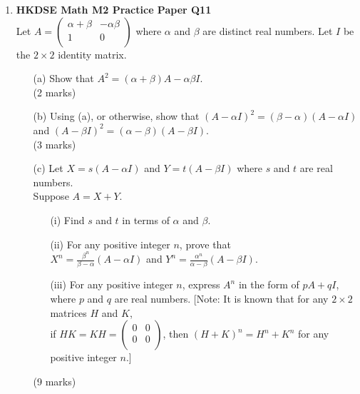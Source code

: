 \documentclass[12pt]{article}
\begin{document}
\begin{enumerate}
	\item \textbf{HKDSE Math M2 Practice Paper Q11}\\
	Let $A = \begin{pmatrix}
		\alpha + \beta & -\alpha\beta \\
		1 & 0 \\
	\end{pmatrix}$ where $\alpha$ and $\beta$ are distinct real numbers. Let $I$ be the $2\times2$ identity matrix.  
	\begin{enumerate}
		\item [(a)]Show that $A^2 = (\alpha +\beta)A - \alpha\beta I$. \\(2 marks)
		\item [(b)]Using (a), or otherwise, show that $(A - \alpha I)^2 = (\beta - \alpha)(A - \alpha I)$ and $(A - \beta I)^2 = (\alpha - \beta)(A - \beta I)$. \\(3 marks)
		\item [(c)]Let $X = s(A-\alpha I)$ and $Y = t(A-\beta I)$ where $s$ and $t$ are real numbers. \\
		Suppose $A = X + Y$.
		\begin{enumerate}
			\item [(i)]Find $s$ and $t$ in terms of $\alpha$ and $\beta$.
			\item [(ii)]For any positive integer $n$, prove that \\
			$X^n = \displaystyle\frac{\beta^n}{\beta - \alpha} (A - \alpha I)$ and $Y^n = \displaystyle\frac{\alpha^n}{\alpha - \beta}(A - \beta I)$.
			\item [(iii)]For any positive integer $n$, express $A^n$ in the form of $pA + qI$, where $p$ and $q$ are real numbers.  
			[Note: It is known that for any $2\times2 $ matrices $H$ and $K$,\\
			if $HK = KH = \begin{pmatrix}
				0&0\\0&0\\
			\end{pmatrix}$, then $(H+K)^n = H^n + K^n$ for any positive integer $n$.]
		\end{enumerate}
		(9 marks)
	\end{enumerate}


\end{enumerate}
\end{document}
